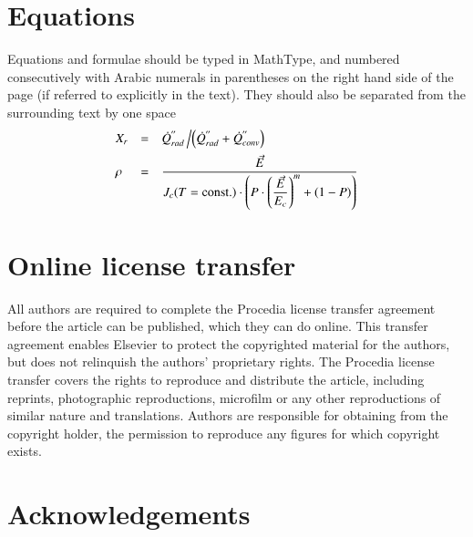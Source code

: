 \documentclass[5p,times,procedia]{elsarticle}
\begin{document}
\section{Equations}
Equations and formulae should be typed in MathType, and numbered consecutively with Arabic numerals in parentheses on the right hand side of the page (if referred to explicitly in the text). They should also be separated from the surrounding text by one space
\begin{equation}
\begin{array}{lcl}
\displaystyle X_r &=& \displaystyle\dot{Q}^{''}_{rad}\left/\left(\dot{Q}^{''}_{rad} + \dot{Q}^{''}_{conv}\right)\right.\\[6pt]
\displaystyle \rho &=& \displaystyle\frac{\vec{E}}{J_c(T={\rm const.})\cdot\left(P\cdot\left(\displaystyle\frac{\vec{E}}{E_c}\right)^m+(1-P)\right)}
\end{array}
\end{equation}


\section{Online license transfer}
All authors are required to complete the Procedia license transfer
agreement before the article can be published, which they can do online. This transfer agreement enables Elsevier to protect the copyrighted material for the authors, but does not relinquish the authors' proprietary rights. The Procedia license transfer covers the rights to reproduce and distribute the article, including reprints, photographic reproductions, microfilm or any other reproductions of similar nature and translations. Authors are responsible for obtaining from the copyright holder, the permission to reproduce any figures for which copyright exists.

\vfill\pagebreak

\section*{Acknowledgements}
\end{document}
